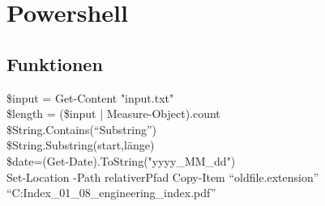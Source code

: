 \chapter{Powershell}\label{chap:Powershell}
\section{Funktionen}
\$input = Get-Content "input.txt"\\
\$length = (\$input | Measure-Object).count\\
\$String.Contains(\enquote{Substring})\\
\$String.Substring(start,länge)\\
\$date=(Get-Date).ToString("yyyy\_MM\_dd")\\
Set-Location -Path relativerPfad
Copy-Item \enquote{oldfile.extension} \enquote{C:\Users\Maurice\Documents\Engineering Index_01_08_engineering_index.pdf}\\
